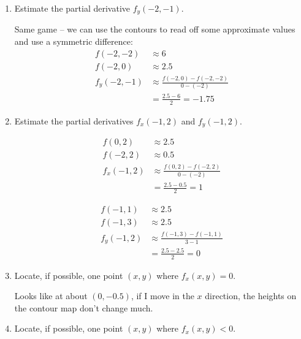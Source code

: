 \documentclass[10pt]{article}
\newenvironment{red}{\color{red}}{\ignorespacesafterend}
\begin{document}
\begin{enumerate}[leftmargin=0pt]
\begin{enumerate}
    \item Estimate the partial derivative $f_y(-2, -1).$
    
    \begin{red}
    Same game -- we can use the contours to read off some approximate values and use a symmetric difference: 
    \begin{align*}
        f(-2, -2) &\approx 6 \\
        f(-2, 0) &\approx 2.5 \\
        f_y(-2,-1) &\approx 
        \frac{f(-2, 0) - f(-2, -2)}{0-(-2)} \\
        &= \frac{2.5-6}{2} = -1.75
    \end{align*}
    \end{red}
    
    \item Estimate the partial derivatives $f_x(-1, 2)$ and $f_y(-1, 2)$.
    \begin{red}
    \begin{multicols}{2}
    \begin{align*}
        f(0, 2) &\approx 2.5\\
        f(-2, 2) &\approx 0.5 \\
        f_x(-1,2) &\approx 
        \frac{f(0,2)-f(-2,2)}{0-(-2)} \\
        &= \frac{2.5-0.5}{2} = 1
    \end{align*}
    
    \begin{align*}
        f(-1,1) &\approx 2.5 \\
        f(-1,3) &\approx 2.5 \\
        f_y(-1,2) &\approx
        \frac{f(-1,3)-f(-1,1)}{3-1} \\
        &= \frac{2.5-2.5}{2} = 0
    \end{align*}
    \end{multicols}
    \end{red}
    
    \item Locate, if possible, one point $(x,y)$ where $f_x(x,y)=0$.
    
    \begin{red}
    Looks like at about $(0, -0.5)$, if I move in the $x$ direction, the heights on the contour map don't change much.
    \end{red}
    
    \item Locate, if possible, one point $(x,y)$ where $f_x(x,y)<0$.
    

\end{enumerate}
\end{enumerate}
\end{document}

